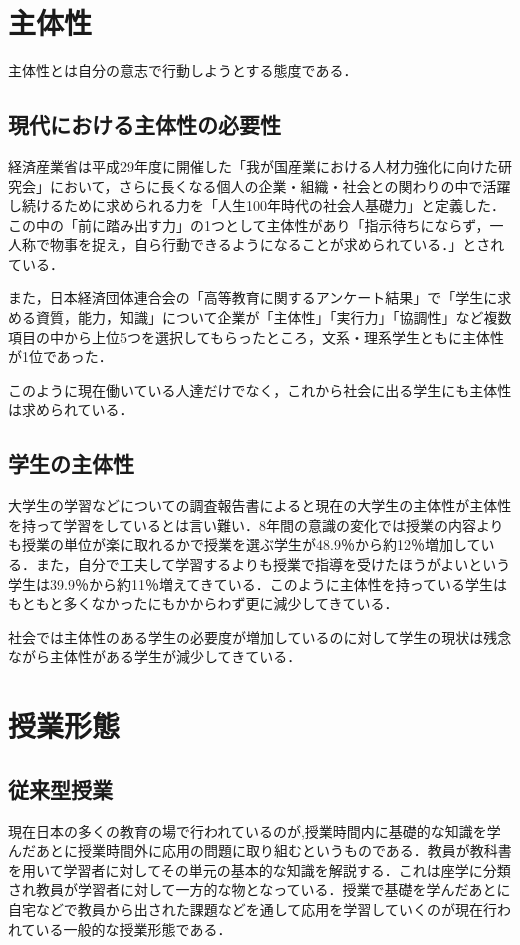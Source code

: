\documentclass[a4j,11pt]{jsarticle}
\begin{document}
\section{主体性}
主体性とは自分の意志で行動しようとする態度である\cite{3}．

\subsection{現代における主体性の必要性}
経済産業省\cite{4}は平成29年度に開催した「我が国産業における人材力強化に向けた研究会」において，さらに長くなる個人の企業・組織・社会との関わりの中で活躍し続けるために求められる力を「人生100年時代の社会人基礎力」と定義した．この中の「前に踏み出す力」の1つとして主体性があり「指示待ちにならず，一人称で物事を捉え，自ら行動できるようになることが求められている．」とされている．

また，日本経済団体連合会\cite{5}の「高等教育に関するアンケート結果」で「学生に求める資質，能力，知識」について企業が「主体性」「実行力」「協調性」など複数項目の中から上位5つを選択してもらったところ，文系・理系学生ともに主体性が1位であった．

このように現在働いている人達だけでなく，これから社会に出る学生にも主体性は求められている．

\subsection{学生の主体性}
大学生の学習などについての調査報告書\cite{6}によると現在の大学生の主体性が主体性を持って学習をしているとは言い難い．8年間の意識の変化では授業の内容よりも授業の単位が楽に取れるかで授業を選ぶ学生が48.9％から約12％増加している．また，自分で工夫して学習するよりも授業で指導を受けたほうがよいという学生は39.9％から約11％増えてきている．このように主体性を持っている学生はもともと多くなかったにもかからわず更に減少してきている．

社会では主体性のある学生の必要度が増加しているのに対して学生の現状は残念ながら主体性がある学生が減少してきている．



\newpage

\section{授業形態}
\subsection{従来型授業}
現在日本の多くの教育の場で行われているのが,授業時間内に基礎的な知識を学んだあとに授業時間外に応用の問題に取り組むというものである．教員が教科書を用いて学習者に対してその単元の基本的な知識を解説する．これは座学に分類され教員が学習者に対して一方的な物となっている．授業で基礎を学んだあとに自宅などで教員から出された課題などを通して応用を学習していくのが現在行われている一般的な授業形態である．
\end{document}
